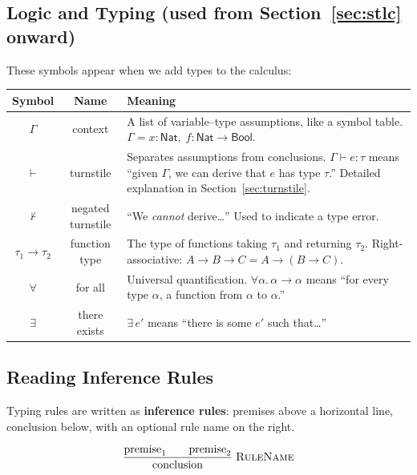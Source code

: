 \documentclass[11pt,a4paper]{article}
\theoremstyle{definition}
\newcommand{\proves}{\vdash}
\newcommand{\nproves}{\nvdash}
\begin{document}
\subsection{Logic and Typing (used from Section~\ref{sec:stlc} onward)}

These symbols appear when we add types to the calculus:

\begin{center}
\renewcommand{\arraystretch}{1.6}
\begin{tabular}{ccp{8.5cm}}
\textbf{Symbol} & \textbf{Name} & \textbf{Meaning} \\
\hline
$\Gamma$ & context &
  A list of variable--type assumptions, like a symbol table.
  $\Gamma = x{:}\textsf{Nat},\; f{:}\textsf{Nat}{\to}\textsf{Bool}$. \\

$\proves$ & turnstile &
  Separates assumptions from conclusions.
  $\Gamma \proves e : \tau$ means ``given $\Gamma$, we can derive that $e$ has type $\tau$.''
  Detailed explanation in Section~\ref{sec:turnstile}. \\

$\nproves$ & negated turnstile &
  ``We \emph{cannot} derive\ldots'' Used to indicate a type error. \\

$\tau_1 \to \tau_2$ & function type &
  The type of functions taking $\tau_1$ and returning $\tau_2$.
  Right-associative: $A \to B \to C = A \to (B \to C)$. \\

$\forall$ & for all &
  Universal quantification. $\forall \alpha.\, \alpha \to \alpha$ means
  ``for every type $\alpha$, a function from $\alpha$ to $\alpha$.'' \\

$\exists$ & there exists &
  $\exists\, e'$ means ``there is some $e'$ such that\ldots'' \\
\end{tabular}
\end{center}

\subsection{Reading Inference Rules}

Typing rules are written as \textbf{inference rules}: premises above a
horizontal line, conclusion below, with an optional rule name on the right.

\[
\dfrac{\text{premise}_1 \qquad \text{premise}_2}
      {\text{conclusion}}
\;\textsc{RuleName}
\]
\end{document}
